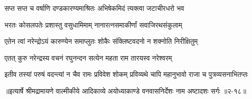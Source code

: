 \twolineshloka
{सप्त सप्त च वर्षाणि दण्डकारण्यमाश्रितः}
{अभिषेकमिदं त्यक्त्वा जटाचीरधरो भव} %

\twolineshloka
{भरतः कोसलपतेः प्रशास्तु वसुधामिमाम्}
{नानारत्नसमाकीर्णां सवाजिरथसंकुलाम्} %

\twolineshloka
{एतेन त्वां नरेन्द्रोऽयं कारुण्येन समाप्लुतः}
{शोकैः संक्लिष्टवदनो न शक्नोति निरीक्षितुम्} %

\twolineshloka
{एतत् कुरु नरेन्द्रस्य वचनं रघुनन्दन}
{सत्येन महता राम तारयस्व नरेश्वरम्} %

\twolineshloka
{इतीव तस्यां परुषं वदन्त्यां न चैव रामः प्रविवेश शोकम्}
{प्रविव्यथे चापि महानुभावो राजा च पुत्रव्यसनाभितप्तः} %


॥इत्यार्षे श्रीमद्रामायणे वाल्मीकीये आदिकाव्ये अयोध्याकाण्डे वनवासनिर्देशः नाम अष्टादशः सर्गः ॥२-१८॥
